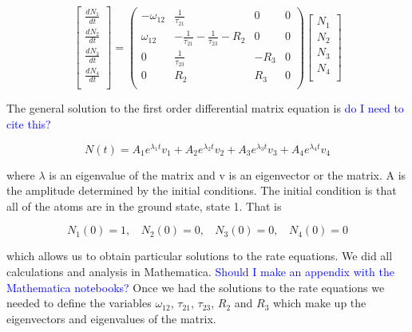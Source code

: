 \documentclass[prb,preprint]{revtex4-1}
\begin{document}
\begin{equation}
\label{RateEqMatrix}
\begin{bmatrix}
	\frac{dN_1}{dt} \\
	\frac{dN_2}{dt} \\
	\frac{dN_3}{dt} \\
	\frac{dN_4}{dt} \\
\end{bmatrix}
=
\begin{pmatrix}
	-\omega_{12} & \frac{1}{\tau_{21}}  & 0 &  0   \\
	\omega_{12}  & -\frac{1}{\tau_{21}}- \frac{1}{\tau_{23}}-R_2 & 0 & 0 \\
	0  &  \frac{1}{\tau_{23}}  & - R_3 & 0 \\
	0  &  R_2  & R_3 & 0  \\
\end{pmatrix}
\begin{bmatrix}
	N_1 \\
	N_2 \\
	N_3 \\
	N_4 \\
\end{bmatrix}
\end{equation}

The general solution to the first order differential matrix equation is \textcolor{blue}{do I need to cite this?}

\begin{equation}
\label{RateEqSol}
N(t) = A_1e^{\lambda_1 t} v_1 + A_2e^{\lambda_2 t} v_2 + A_3e^{\lambda_3 t} v_3 + A_4e^{\lambda_4 t} v_4 
\end{equation}

where $\lambda$ is an eigenvalue of the matrix and v is an eigenvector or the matrix.  A is the amplitude determined by the initial conditions. The initial condition is that all of the atoms are in the ground state, state 1. That is

\begin{equation}
\label{InitialCond}
N_1(0) = 1, \	\	\	\	
N_2(0) = 0, \	\	\	\	
N_3(0) = 0, \	\	\	\	
N_4(0) = 0 
\end{equation}

which allows us to obtain particular solutions to the rate equations. We did all calculations and analysis in Mathematica. \textcolor{blue}{Should I make an appendix with the Mathematica notebooks?} Once we had the solutions to the rate equations we needed to define the variables $\omega_{12}$, $\tau_{21}$, $\tau_{23}$, $R_2$ and $R_3$ which make up the eigenvectors and eigenvalues of the matrix.
\end{document}
